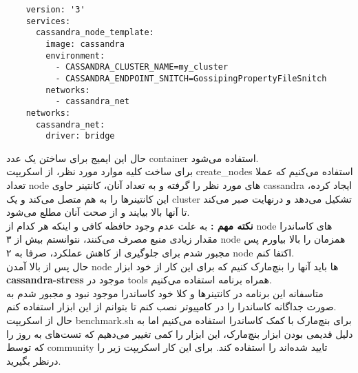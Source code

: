 \begin{latin}
  \begin{verbatim}
    version: '3'
    services:
      cassandra_node_template:
        image: cassandra
        environment:
          - CASSANDRA_CLUSTER_NAME=my_cluster
          - CASSANDRA_ENDPOINT_SNITCH=GossipingPropertyFileSnitch
        networks:
          - cassandra_net
    networks:
      cassandra_net:
        driver: bridge
  \end{verbatim}
\end{latin}
\noindent
حال این ایمیج برای ساختن یک عدد 
container 
استفاده می‌شود.
\\
برای ساخت کلیه موارد مورد نظر، از اسکریپت create\_nodes استفاده می‌کنیم که عملا تعداد node های مورد نظر را 
گرفته و به تعداد آنان، کانتینر حاوی 
cassandra 
ایجاد کرده، 
این کانتینرها را به هم متصل می‌کند و یک 
cluster 
تشکیل می‌دهد و درنهایت 
صبر می‌کند تا آنها بالا بیایند و از صحت آنان مطلع می‌شود.
\\
\textbf{نکته مهم : } 
به علت عدم وجود حافظه کافی و اینکه هر کدام از 
node 
های کاساندرا مقدار زیادی منبع مصرف می‌کنند، نتوانستم بیش از ۳ 
node 
همزمان را بالا بیاورم پس مجبور شدم برای جلوگیری از کاهش عملکرد، صرفا به ۲ node 
اکتفا کنم.
\\
حال پس از بالا آمدن node 
ها باید آنها را بنچ‌مارک کنیم که برای این کار از خود ابزار 
\textbf{cassandra-stress}
موجود در tools 
همراه برنامه استفاده می‌کنیم.
\\
متاسفانه این برنامه در کانتینرها و کلا  
خود کاساندرا موجود نبود و مجبور شدم به صورت جداگانه کاساندرا را در کامپیوتر نصب کنم تا بتوانم از این ابزار استفاده کنم.\\
حال از اسکریپت benchmark.sh 
برای بنچ‌مارک با کمک کاساندرا استفاده می‌کنیم اما به دلیل قدیمی بودن ابزار بنچ‌مارک، این ابزار را کمی تغییر می‌دهیم که تست‌های به روز را که توسط 
community 
تایید شده‌اند را استفاده کند.
برای این کار اسکریپت زیر را درنظر بگیرید.
